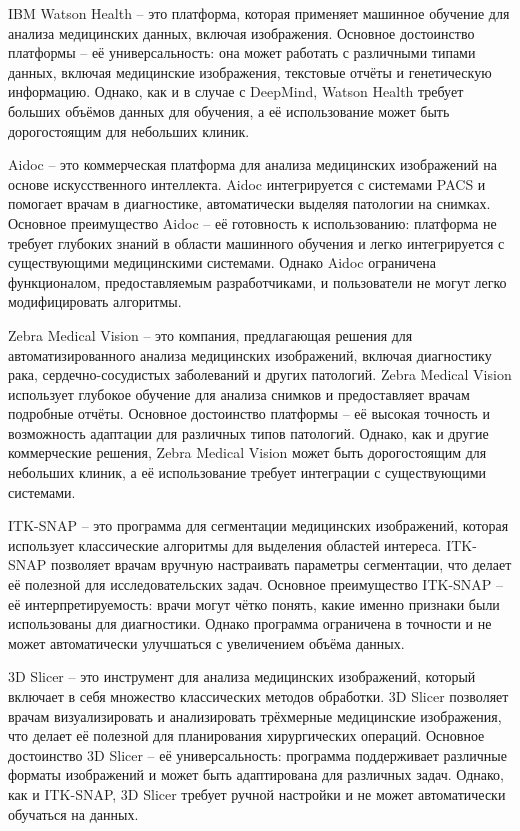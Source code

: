 {  \par \redline IBM Watson Health – это платформа, которая применяет машинное обучение для анализа медицинских данных, включая изображения. Основное достоинство платформы – её универсальность: она может работать с различными типами данных, включая медицинские изображения, текстовые отчёты и генетическую информацию. Однако, как и в случае с DeepMind, Watson Health требует больших объёмов данных для обучения, а её использование может быть дорогостоящим для небольших клиник.

  \par \redline Aidoc – это коммерческая платформа для анализа медицинских изображений на основе искусственного интеллекта. Aidoc интегрируется с системами PACS и помогает врачам в диагностике, автоматически выделяя патологии на снимках. Основное преимущество Aidoc – её готовность к использованию: платформа не требует глубоких знаний в области машинного обучения и легко интегрируется с существующими медицинскими системами. Однако Aidoc ограничена функционалом, предоставляемым разработчиками, и пользователи не могут легко модифицировать алгоритмы.

  \par \redline Zebra Medical Vision – это компания, предлагающая решения для автоматизированного анализа медицинских изображений, включая диагностику рака, сердечно-сосудис\-тых заболеваний и других патологий. Zebra Medical Vision использует глубокое обучение для анализа снимков и предоставляет врачам подробные отчёты. Основное достоинство платформы – её высокая точность и возможность адаптации для различных типов патологий. Однако, как и другие коммерческие решения, Zebra Medical Vision может быть дорогостоящим для небольших клиник, а её использование требует интеграции с существующими системами.

  \par \redline ITK-SNAP – это программа для сегментации медицинских изображений, которая использует классические алгоритмы для выделения областей интереса. ITK-SNAP позволяет врачам вручную настраивать параметры сегментации, что делает её полезной для исследовательских задач. Основное преимущество ITK-SNAP – её интерпретируемость: врачи могут чётко понять, какие именно признаки были использованы для диагностики. Однако программа ограничена в точности и не может автоматически улучшаться с увеличением объёма данных.

  \par \redline 3D Slicer – это инструмент для анализа медицинских изображений, который включает в себя множество классических методов обработки. 3D Slicer позволяет врачам визуализировать и анализировать трёхмерные медицинские изображения, что делает её полезной для планирования хирургических операций. Основное достоинство 3D Slicer – её универсальность: программа поддерживает различные форматы изображений и может быть адаптирована для различных задач. Однако, как и ITK-SNAP, 3D Slicer требует ручной настройки и не может автоматически обучаться на данных.

}
